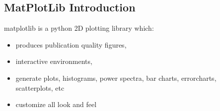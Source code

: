 \subsection{MatPlotLib Introduction}

\begin{frame}[fragile]
matplotlib is a python 2D plotting library which:
\begin{itemize}
\item produces publication quality figures,
\item interactive environments,
\item generate plots, histograms, power spectra, bar charts, errorcharts, scatterplots, etc
\item customize all look and feel
\end{itemize}
\end{frame}
